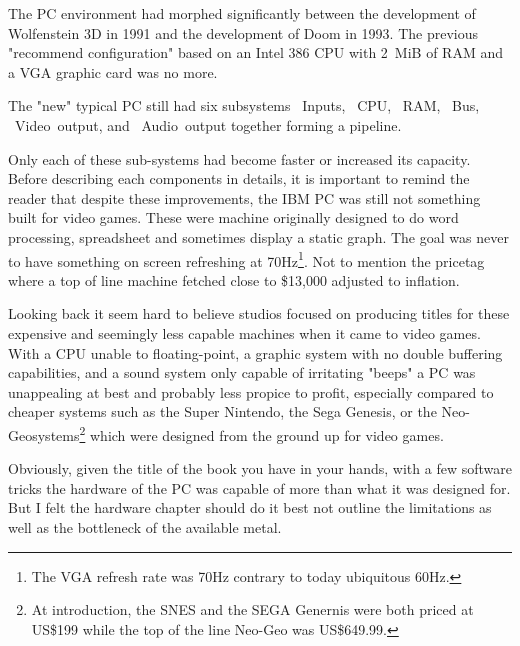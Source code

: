 The PC environment had morphed significantly between the development of Wolfenstein 3D in 1991 and the development of Doom in 1993. The previous "recommend configuration" based on an Intel 386 CPU with 2~MiB of RAM and a VGA graphic card was no more.\\
\par
The "new" typical PC still had six subsystems ~Inputs, ~CPU, ~RAM, ~Bus, ~Video~output, and ~Audio~output together forming a pipeline.\\
\par
{}
\par
Only each of these sub-systems had become faster or increased its capacity. Before describing each components in details, it is important to remind the reader that despite these improvements, the IBM PC was still not something built for video games. These were machine originally designed to do word processing, spreadsheet and sometimes display a static graph. The goal was never to have something on screen refreshing at 70Hz\footnote{The VGA refresh rate was 70Hz contrary to today ubiquitous 60Hz.}. Not to mention the pricetag where a top of line machine fetched close to \$13,000 adjusted to inflation.\\
\par Looking back it seem hard to believe studios focused on producing titles for these expensive and seemingly less capable machines when it came to video games. With a CPU unable to floating-point, a graphic system with no double buffering capabilities, and a sound system only capable of irritating "beeps" a PC was unappealing at best and probably less propice to profit, especially compared to cheaper systems such as the Super Nintendo, the Sega Genesis, or the Neo-Geosystems\footnote{At introduction, the SNES and the SEGA Genernis were both priced at US\$199 while the top of the line Neo-Geo was US\$649.99.} which were designed from the ground up for video games. \\
\par
Obviously, given the title of the book you have in your hands, with a few software tricks the hardware of the PC was capable of more than what it was designed for. But I felt the hardware chapter should do it best not outline the limitations as well as the bottleneck of the available metal.\\
\par



